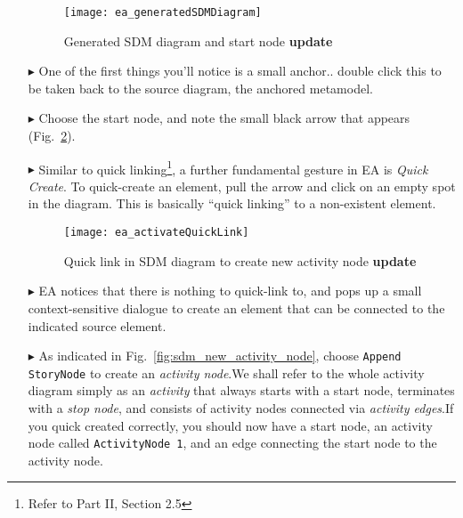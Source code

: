 \begin{itemize}
\begin{figure}[htp]
\begin{center}
  \texttt{[image: ea\_generatedSDMDiagram]}
  \caption{Generated SDM diagram and start node {\bf update}}  
  \label{fig:sdm_skeleton}
\end{center}
\end{figure}

\item[$\blacktriangleright$] One of the first things you'll notice is a small anchor.. double click this to be taken back to the source diagram, the anchored
metamodel.

\item[$\blacktriangleright$] Choose the start node, and note the small black arrow that appears (Fig.~\ref{fig:sdm_quicklink}). 

\item[$\blacktriangleright$] Similar to quick linking\footnote{Refer to Part II, Section 2.5}, a further fundamental gesture in EA is \emph{Quick Create}. To
quick-create an element, pull the arrow and click on an empty spot in the diagram. This is basically ``quick linking'' to a non-existent element.

\begin{figure}[htp]
\begin{center}
  \texttt{[image: ea\_activateQuickLink]}
  \caption{Quick link in SDM diagram to create new activity node {\bf update}}  
  \label{fig:sdm_quicklink}
\end{center}
\end{figure}

\item[$\blacktriangleright$] EA notices that there is nothing to quick-link to, and pops up a small context-sensitive dialogue to create an element that can be
connected to the indicated source element.

\item[$\blacktriangleright$] As indicated in Fig.~\ref{fig:sdm_new_activity_node}, choose \texttt{Append StoryNode} to create an \emph{activity
node}.We shall refer to the whole activity diagram simply as an \emph{activity} that always starts with a start node,
terminates with a \emph{stop node}, and consists of activity nodes connected via \emph{activity edges}.If you quick created correctly,
you should now have a start node, an activity node called \texttt{ActivityNode 1}, and an edge connecting the start node to the activity node.


\end{itemize}
